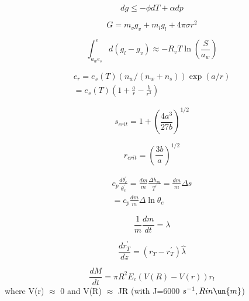 \documentclass[12pt]{article}
\begin{document}
\begin{multicols}{2}
  \begin{equation}
    \label{eq:dg}
    dg \leq -\phi dT + \alpha dp
  \end{equation}


  \begin{equation}
    \label{eq:G}
    G = m_v g_v + m_l g_l + 4 \pi \sigma r^2
  \end{equation}

  \begin{equation}
    \label{eq:newint}
    \int_{a_w e_s}^e  d(g_l - g_v) \approx  - R_v T\ln \left (
      \frac{S}{a_w} \right )
  \end{equation}



\begin{multline}
  \label{equil}
  e_{r} = e_s(T)(n_w/(n_w + n_s))\exp(a/r) \\
  = e_s(T)(1 + \frac{a}{r} - \frac{b}{r^3})
\end{multline}

\begin{equation}
  \label{eq:sscrit}
  s_{crit}= 1 + \left ( \frac{4 a^3}{27 b} \right )^{1/2}
\end{equation}

\begin{equation}
  \label{eq:rcrit}
  r_{crit} = \left ( \frac{3b}{a} \right )^{1/2}
\end{equation}

\begin{gather}
  \label{eq:2ndb}
  c_p \frac{d\theta_e^\prime}{\theta_e^\prime} = 
          \frac{dm}{m} \frac{\Delta h_m}{T^\prime} = \frac{dm}{m} \Delta s \nonumber\\
   = c_p \frac{dm}{m} \Delta \ln \theta_e    
\end{gather}

\begin{equation}
  \label{eq:plume}
  \frac{1}{m} \frac{dm}{dt} = \lambda
\end{equation}

\begin{equation}
  \label{eq:water}
  \frac{dr_T^\prime}{dz} = (r_T - r_T^\prime) \hat{\lambda}
\end{equation}

\begin{equation}
  \label{eq:collec}
  \frac{dM}{dt} = \pi R^2 E_c (V(R) - V(r)) r_l
\end{equation}
where V(r) $\approx$ 0 and V(R) $\approx$ JR (with J=6000 $s^{-1}, R in \un{m}$)


\end{multicols}
\end{document}
